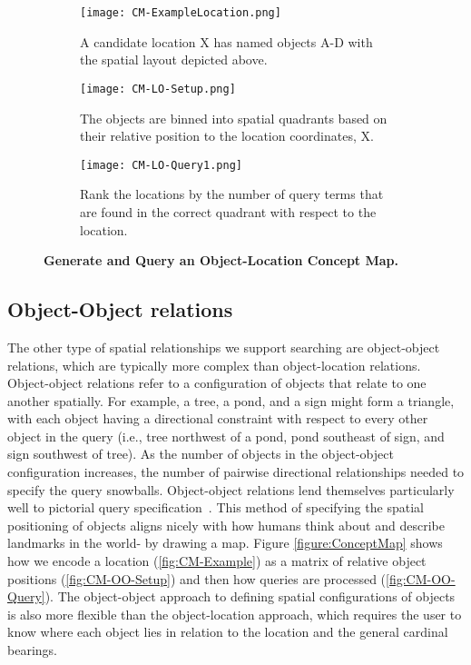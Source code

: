 \begin{figure*}[h]
    \centering
    \begin{subfigure}[t]{.25\textwidth}
        \texttt{[image: CM-ExampleLocation.png]}
        \caption{\small A candidate location X has named objects A-D with the spatial layout depicted above.} 
        \label{fig:CM-LO-Example}
    \end{subfigure}
    \hfill
    \begin{subfigure}[t]{.25\textwidth}
        \texttt{[image: CM-LO-Setup.png]}
        \caption{\small The objects are binned into spatial quadrants based on their relative position to the location coordinates, X.} 
        \label{fig:CM-LO-Setup}
    \end{subfigure}
    \hfill
        \begin{subfigure}[t]{.25\textwidth}
        \texttt{[image: CM-LO-Query1.png]}
        \caption{\small Rank the locations by the number of query terms that are found in the correct quadrant with respect to the location.}
        \label{fig:CM-LO-Query}
    \hfill
    \end{subfigure}
    \caption{\textbf{Generate and Query an Object-Location Concept Map.}}\label{figure:ConceptMap-LO} 
\end{figure*}



\subsection{Object-Object relations}

The other type of spatial relationships we support searching are object-object relations, which are typically more complex than object-location relations.
Object-object relations refer to a configuration of objects that relate to one another spatially.
For example, a tree, a pond, and a sign might form a triangle, with each object having a directional constraint with respect to every other object in the query (i.e., tree northwest of a pond, pond southeast of sign, and sign southwest of tree).
As the number of objects in the object-object configuration increases, the number of pairwise directional relationships needed to specify the query snowballs.
Object-object relations lend themselves particularly well to pictorial query specification~\cite{Soffer1997}.
This method of specifying the spatial positioning of objects aligns nicely with how humans think about and describe landmarks in the world- by drawing a map. 
Figure \ref{figure:ConceptMap} shows how we encode a location (\ref{fig:CM-Example}) as a matrix of relative object positions (\ref{fig:CM-OO-Setup}) and then how queries are processed (\ref{fig:CM-OO-Query}).
The object-object approach to defining spatial configurations of objects is also more flexible than the object-location approach, which requires the user to know where each object lies in relation to the location and the general cardinal bearings.

